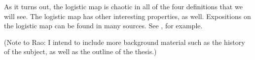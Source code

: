 \documentclass[10pt,twoside,draft]{book}
\begin{document}

As it turns out, the logistic map is chaotic in all of the four definitions that we will see.
The logistic map has other interesting properties, as well.
Expositions on the logistic map can be found in many sources.
See \citep{may1, may2, devaney}, for example.

(Note to Rao: I intend to include more background material such as the history of the subject, as well as the outline of the thesis.)
\end{document}
